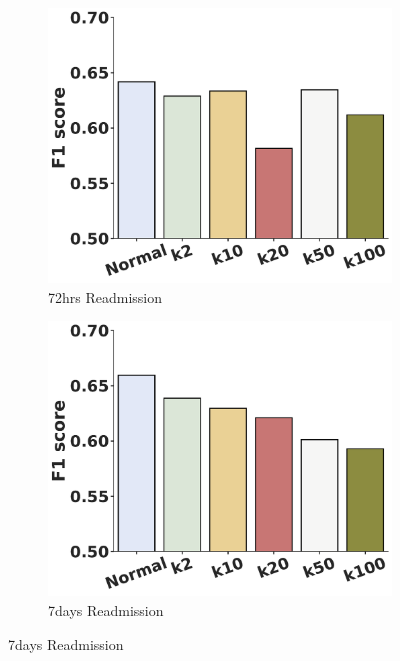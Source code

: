 \documentclass{bioinfo}
\begin{document}
\begin{figure}[!tpb]
\begin{subfigure}[b]{.45\linewidth}
\centering
\includegraphics[width=\linewidth]{readmission_pred_72hrs.pdf}
\caption{72hrs Readmission}
\label{sfig:72hrsReadmission}
\end{subfigure}%
\begin{subfigure}[b]{.45\linewidth}
\centering
\includegraphics[width=\linewidth]{readmission_pred_7days.pdf}
\caption{7days Readmission}
\label{sfig:7daysReadmission}
\end{subfigure}%



\end{figure}
\end{document}
